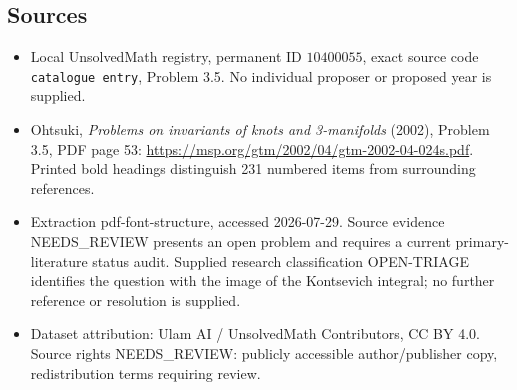 \documentclass[11pt]{article}
\begin{document}
\subsection{Sources}
\begin{itemize}
\item Local UnsolvedMath registry, permanent ID \(10400055\), exact source code \texttt{catalogue entry}, Problem 3.5. No individual proposer or proposed year is supplied.
\item Ohtsuki, \emph{Problems on invariants of knots and 3-manifolds} (2002), Problem 3.5, PDF page 53: \url{https://msp.org/gtm/2002/04/gtm-2002-04-024s.pdf}. Printed bold headings distinguish 231 numbered items from surrounding references.
\item Extraction pdf-font-structure, accessed 2026-07-29. Source evidence NEEDS\_REVIEW presents an open problem and requires a current primary-literature status audit. Supplied research classification OPEN-TRIAGE identifies the question with the image of the Kontsevich integral; no further reference or resolution is supplied.
\item Dataset attribution: Ulam AI / UnsolvedMath Contributors, CC BY 4.0. Source rights NEEDS\_REVIEW: publicly accessible author/publisher copy, redistribution terms requiring review.
\end{itemize}
\end{document}
